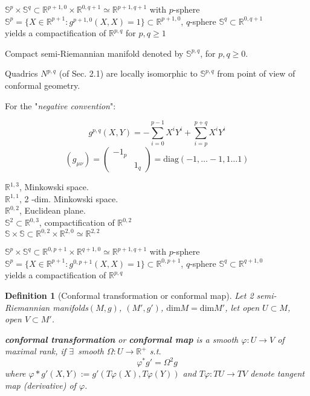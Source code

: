 \documentclass[10pt]{amsart}
\newtheorem{definition}{Definition}
\begin{document}
\begin{multicols*}{2}
$\mathbb{S}^p \times \mathbb{S}^q \subset \mathbb{R}^{p+1, 0} \times \mathbb{R}^{0, q+1} \simeq \mathbb{R}^{p+1,q+1}$ with $p$-sphere $\mathbb{S}^p = \lbrace X \in \mathbb{R}^{p+1} : g^{p+1, 0}(X,X) = 1\rbrace \subset \mathbb{R}^{p+1,0}$, $q$-sphere $\mathbb{S}^q \subset \mathbb{R}^{0, q+1}$ \\
yields a compactification of $\mathbb{R}^{p,q}$ for $p,q \geq 1$

Compact semi-Riemannian manifold denoted by $\mathbb{S}^{p,q}$, for $p, q\geq 0$.

Quadrics $N^{p,q}$ (of Sec. 2.1) are locally isomorphic to $\mathbb{S}^{p,q}$ from point of view of conformal geometry.

For the "\emph{negative convention}": 

\[
g^{p,q}(X,Y) = - \sum_{i=0}^{p-1} X^i Y^i + \sum_{i=p}^{p+q} X^i Y^i
\]
\[
(g_{\mu \nu}) = \left( \begin{matrix} -1_p & \\ & 1_q \end{matrix} \right) = \text{diag}(-1 , \dots - 1, 1 \dots 1)
\]

$\mathbb{R}^{1,3} $, Minkowski space. \\
$\mathbb{R}^{1,1}$, 2 -dim. Minkowski space. \\
$\mathbb{R}^{0,2}$, Euclidean plane. \\
$\mathbb{S}^2 \subset \mathbb{R}^{0,3}$, compactification of $\mathbb{R}^{0,2}$ \\
$\mathbb{S} \times \mathbb{S} \subset \mathbb{R}^{0,2} \times \mathbb{R}^{2,0} \simeq \mathbb{R}^{2,2}$ 

$\mathbb{S}^p \times \mathbb{S}^q \subset \mathbb{R}^{0, p+1} \times \mathbb{R}^{q+1, 0} \simeq \mathbb{R}^{p+1,q+1}$ with $p$-sphere $\mathbb{S}^p = \lbrace X \in \mathbb{R}^{p+1} : g^{ 0, p+1}(X,X) = 1\rbrace \subset \mathbb{R}^{0, p+1}$, $q$-sphere $\mathbb{S}^q \subset \mathbb{R}^{q+1, 0}$ \\
yields a compactification of $\mathbb{R}^{p,q}$ 




\begin{definition}[Conformal transformation or conformal map]
Let 2 semi-Riemannian manifolds$(M,g)$, $(M',g')$, $\text{dim}M = \text{dim}M'$, let open $U\subset M$, open $V\subset M'$.  

\textbf{conformal transformation} or \textbf{conformal map} is a smooth $\varphi : U\to V$ of maximal rank, if $\exists \, $ smooth $\Omega : U\to \mathbb{R}^+$ s.t. 
\begin{equation}
	\varphi^* g' = \Omega^2 g
\end{equation}
where $\varphi* g'(X,Y) :=g'(T\varphi(X), T\varphi(Y))$ and $T\varphi: TU \to TV$ denote tangent map (derivative) of $\varphi$.  


\end{definition}
\end{multicols*}
\end{document}
